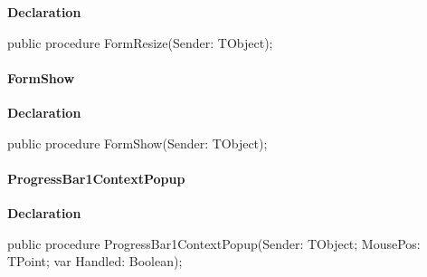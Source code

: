 \documentclass{report}
\newif\ifpdf
\begin{document}
\label{manager.TmnFrm-FormResize}
\begin{list}{}{
\setlength{\itemindent}{0cm}
\setlength{\listparindent}{0cm}
\setlength{\leftmargin}{\evensidemargin}
\addtolength{\leftmargin}{\tmplength}
\settowidth{\labelsep}{X}
\addtolength{\leftmargin}{\labelsep}
\setlength{\labelwidth}{\tmplength}
}
\item[\textbf{Declaration}\hfill]
\ifpdf
\begin{flushleft}
\fi
\begin{ttfamily}
public procedure FormResize(Sender: TObject);\end{ttfamily}

\ifpdf
\end{flushleft}
\fi

\end{list}
\paragraph*{FormShow}\hspace*{\fill}

\label{manager.TmnFrm-FormShow}
\begin{list}{}{
\setlength{\itemindent}{0cm}
\setlength{\listparindent}{0cm}
\setlength{\leftmargin}{\evensidemargin}
\addtolength{\leftmargin}{\tmplength}
\settowidth{\labelsep}{X}
\addtolength{\leftmargin}{\labelsep}
\setlength{\labelwidth}{\tmplength}
}
\item[\textbf{Declaration}\hfill]
\ifpdf
\begin{flushleft}
\fi
\begin{ttfamily}
public procedure FormShow(Sender: TObject);\end{ttfamily}

\ifpdf
\end{flushleft}
\fi

\end{list}
\paragraph*{ProgressBar1ContextPopup}\hspace*{\fill}

\label{manager.TmnFrm-ProgressBar1ContextPopup}
\begin{list}{}{
\setlength{\itemindent}{0cm}
\setlength{\listparindent}{0cm}
\setlength{\leftmargin}{\evensidemargin}
\addtolength{\leftmargin}{\tmplength}
\settowidth{\labelsep}{X}
\addtolength{\leftmargin}{\labelsep}
\setlength{\labelwidth}{\tmplength}
}
\item[\textbf{Declaration}\hfill]
\ifpdf
\begin{flushleft}
\fi
\begin{ttfamily}
public procedure ProgressBar1ContextPopup(Sender: TObject; MousePos: TPoint; var Handled: Boolean);\end{ttfamily}

\ifpdf
\end{flushleft}
\fi

\end{list}
\end{document}
